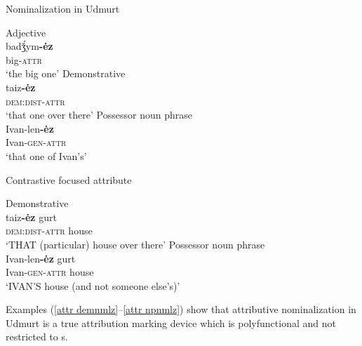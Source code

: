 \begin{exe}
\ex \rm{Nominalization in Udmurt \citep{winkler2001}}
\begin{xlist}
\ex \rm{Adjective}\\
\gll	badǯ́ym\textbf{-ėz}\\
	big-\textsc{attr}\\
\glt	 ‘the big one’
\ex \rm{Demonstrative}\\
\gll	taiz\textbf{-ėz}\\
 	\textsc{dem:dist}-\textsc{attr}\\
\glt	‘that one over there’
\ex \rm{Possessor noun phrase}\\
\gll	Ivan-len\textbf{-ėz}\\
	Ivan-\textsc{gen}-\textsc{attr}\\
\glt	‘that one of Ivan's’
\end{xlist}
\ex \rm{Contrastive focused attribute}
\begin{xlist}
\label{attr demnmlz}
\ex \rm{Demonstrative}\\ 
\gll	taiz\textbf{-ėz} gurt\\
 	\textsc{dem:dist}-\textsc{attr} house\\
\glt	‘THAT (particular) house over there’
\label{attr npnmlz}
\ex \rm{Possessor noun phrase}\\ 
\gll	Ivan-len\textbf{-ėz} gurt\\
	Ivan-\textsc{gen}-\textsc{attr} house\\
\glt	‘IVAN'S house (and not someone else's)’
\end{xlist}
\end{exe}
Examples (\ref{attr demnmlz}–\ref{attr npnmlz}) show that attributive nominalization in Udmurt is a true attribution marking device which is polyfunctional and not restricted to s.

